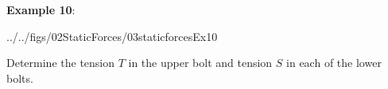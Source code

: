 \documentclass[10pt,onesided]{amsart}
\begin{document}
\newpage



\begin{minipage}[t]{0.45\textwidth}
	\textbf{Example 10}:\\
	\begin{cfig}[0.7]{../../figs/02StaticForces/03staticforcesEx10}\end{cfig}
	\raggedright
	Determine the tension $T$ in the upper bolt and tension $S$ in each of the lower bolts.
\end{minipage}
%
\end{document}
